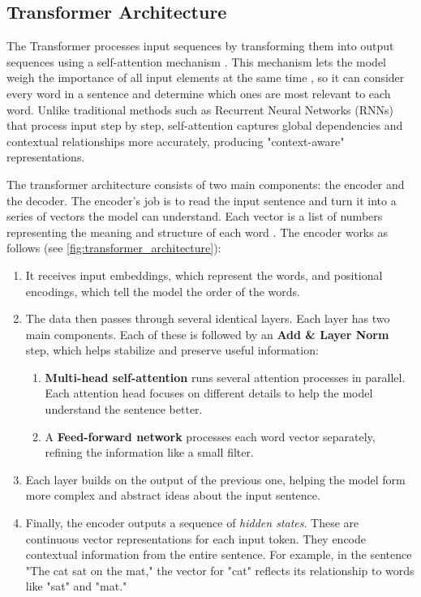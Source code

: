 \subsection{Transformer Architecture} \label{subsection:transformer_arch}
    The Transformer processes input sequences by transforming them into output sequences using a self-attention mechanism \parencite{phuongFormalAlgorithmsTransformers2022}. This mechanism lets the model weigh the importance of all input elements at the same time \parencite{xiaoIntroductionTransformersNLP2023}, so it can consider every word in a sentence and determine which ones are most relevant to each word. Unlike traditional methods such as Recurrent Neural Networks (RNNs) that process input step by step, self-attention captures global dependencies and contextual relationships more accurately, producing "context-aware" representations.

    The transformer architecture consists of two main components: the encoder and the decoder. The encoder’s job is to read the input sentence and turn it into a series of vectors the model can understand. Each vector is a list of numbers representing the meaning and structure of each word \parencite{xiaoIntroductionTransformersNLP2023}. The encoder works as follows (see \autoref{fig:transformer_architecture}):

    \begin{enumerate}
        \item It receives input embeddings, which represent the words, and positional encodings, which tell the model the order of the words.
        
        \item The data then passes through several identical layers. Each layer has two main components. Each of these is followed by an \textbf{Add \& Layer Norm} step, which helps stabilize and preserve useful information:
        \begin{enumerate}[label=\alph*.]
            \item \textbf{Multi-head self-attention} runs several attention processes in parallel. Each attention head focuses on different details to help the model understand the sentence better.
            \item A \textbf{Feed-forward network} processes each word vector separately, refining the information like a small filter.
    \end{enumerate}
    
    \item Each layer builds on the output of the previous one, helping the model form more complex and abstract ideas about the input sentence.
    
    \item Finally, the encoder outputs a sequence of \textit{hidden states}. These are continuous vector representations for each input token. They encode contextual information from the entire sentence. For example, in the sentence "The cat sat on the mat," the vector for "cat" reflects its relationship to words like "sat" and "mat."
\end{enumerate}

